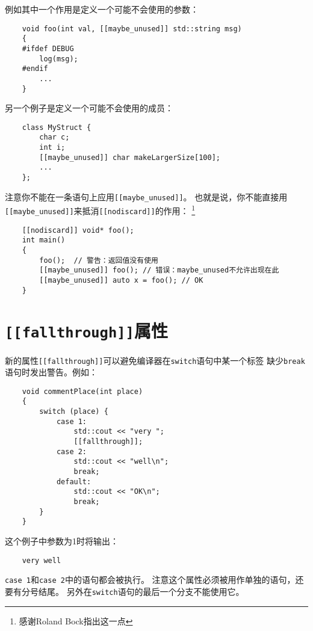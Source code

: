 例如其中一个作用是定义一个可能不会使用的参数：
\begin{lstlisting}
    void foo(int val, [[maybe_unused]] std::string msg)
    {
    #ifdef DEBUG
        log(msg);
    #endif
        ...
    }
\end{lstlisting}
另一个例子是定义一个可能不会使用的成员：
\begin{lstlisting}
    class MyStruct {
        char c;
        int i;
        [[maybe_unused]] char makeLargerSize[100];
        ...
    };
\end{lstlisting}
注意你不能在一条语句上应用\texttt{[[maybe\_unused]]}。
也就是说，你不能直接用\texttt{[[maybe\_unused]]}来抵消\texttt{[[nodiscard]]}的作用：
\footnote{感谢Roland Bock指出这一点}
\begin{lstlisting}
    [[nodiscard]] void* foo();
    int main()
    {
        foo();  // 警告：返回值没有使用
        [[maybe_unused]] foo(); // 错误：maybe_unused不允许出现在此
        [[maybe_unused]] auto x = foo(); // OK
    }
\end{lstlisting}

\section{\texttt{[[fallthrough]]}属性}
新的属性\texttt{[[fallthrough]]}可以避免编译器在\texttt{switch}语句中某一个标签
缺少\texttt{break}语句时发出警告。例如：
\begin{lstlisting}
    void commentPlace(int place)
    {
        switch (place) {
            case 1:
                std::cout << "very ";
                [[fallthrough]];
            case 2:
                std::cout << "well\n";
                break;
            default:
                std::cout << "OK\n";
                break;
        }
    }
\end{lstlisting}
这个例子中参数为1时将输出：
\begin{lstlisting}
    very well
\end{lstlisting}
\texttt{case 1}和\texttt{case 2}中的语句都会被执行。
注意这个属性必须被用作单独的语句，还要有分号结尾。
另外在\texttt{switch}语句的最后一个分支不能使用它。

